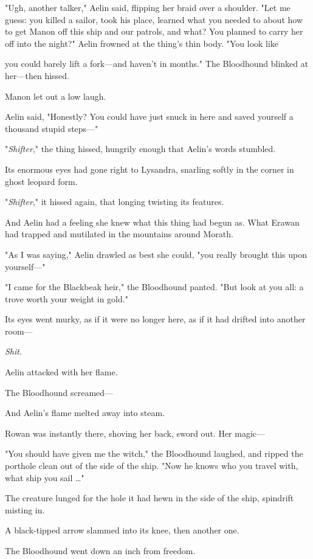 "Ugh, another talker," Aelin said, flipping her braid over a shoulder. "Let me guess: you killed a sailor, took his place, learned what you needed to about how to get Manon off this ship and our patrols, and
 what? You planned to carry her off into the night?" Aelin frowned at the thing's thin body. "You look like

you could barely lift a fork---and haven't in months." The Bloodhound blinked at her---then hissed.

Manon let out a low laugh.

Aelin said, "Honestly? You could have just snuck in here and saved yourself a thousand stupid steps---"

"\emph{Shifter}," the thing hissed, hungrily enough that Aelin's words stumbled.

Its enormous eyes had gone right to Lysandra, snarling softly in the corner in ghost leopard form.

"\emph{Shifter}," it hissed again, that longing twisting its features.

And Aelin had a feeling she knew what this thing had begun as. What Erawan had trapped and mutilated in the mountains around Morath.

"As I was saying," Aelin drawled as best she could, "you really brought this upon yourself---"

"I came for the Blackbeak heir," the Bloodhound panted. "But look at you all: a trove worth your weight in gold."

Its eyes went murky, as if it were no longer here, as if it had drifted into another room---

\emph{Shit}.

Aelin attacked with her flame.

The Bloodhound screamed---

And Aelin's flame melted away into steam.

Rowan was instantly there, shoving her back, sword out. Her magic---

"You should have given me the witch," the Bloodhound laughed, and ripped the porthole clean out of the side of the ship. "Now he knows who you travel with, what ship you sail \ldots"

The creature lunged for the hole it had hewn in the side of the ship, spindrift misting in.

A black-tipped arrow slammed into its knee, then another one.

The Bloodhound went down an inch from freedom.

